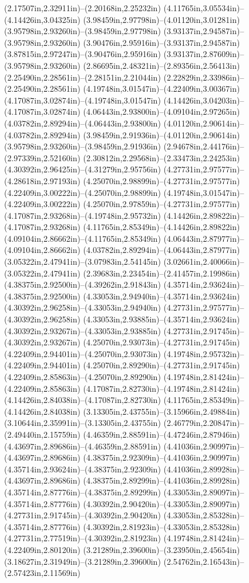 (2.17507in,2.32911in)--(2.20168in,2.25232in) (4.11765in,3.05534in)--(4.14426in,3.04325in) (3.98459in,2.97798in)--(4.01120in,3.01281in) (3.95798in,2.93260in)--(3.98459in,2.97798in) (3.93137in,2.94587in)--(3.95798in,2.93260in) (3.90476in,2.95916in)--(3.93137in,2.94587in) (3.87815in,2.97247in)--(3.90476in,2.95916in) (3.93137in,2.87609in)--(3.95798in,2.93260in) (2.86695in,2.48321in)--(2.89356in,2.56413in) (2.25490in,2.28561in)--(2.28151in,2.21044in) (2.22829in,2.33986in)--(2.25490in,2.28561in) (4.19748in,3.01547in)--(4.22409in,3.00367in) (4.17087in,3.02874in)--(4.19748in,3.01547in) (4.14426in,3.04203in)--(4.17087in,3.02874in) (4.06443in,2.93800in)--(4.09104in,2.97265in) (4.03782in,2.89294in)--(4.06443in,2.93800in) (4.01120in,2.90614in)--(4.03782in,2.89294in) (3.98459in,2.91936in)--(4.01120in,2.90614in) (3.95798in,2.93260in)--(3.98459in,2.91936in) (2.94678in,2.44176in)--(2.97339in,2.52160in) (2.30812in,2.29568in)--(2.33473in,2.24253in) (4.30392in,2.96425in)--(4.31279in,2.95756in) (4.27731in,2.97577in)--(4.28618in,2.97193in) (4.25070in,2.98899in)--(4.27731in,2.97577in) (4.22409in,3.00222in)--(4.25070in,2.98899in) (4.19748in,3.01547in)--(4.22409in,3.00222in) (4.25070in,2.97859in)--(4.27731in,2.97577in) (4.17087in,2.93268in)--(4.19748in,2.95732in) (4.14426in,2.89822in)--(4.17087in,2.93268in) (4.11765in,2.85349in)--(4.14426in,2.89822in) (4.09104in,2.86662in)--(4.11765in,2.85349in) (4.06443in,2.87977in)--(4.09104in,2.86662in) (4.03782in,2.89294in)--(4.06443in,2.87977in) (3.05322in,2.47941in)--(3.07983in,2.54145in) (3.02661in,2.40066in)--(3.05322in,2.47941in) (2.39683in,2.23454in)--(2.41457in,2.19986in) (4.38375in,2.92500in)--(4.39262in,2.91843in) (4.35714in,2.93624in)--(4.38375in,2.92500in) (4.33053in,2.94940in)--(4.35714in,2.93624in) (4.30392in,2.96258in)--(4.33053in,2.94940in) (4.27731in,2.97577in)--(4.30392in,2.96258in) (4.33053in,2.93885in)--(4.35714in,2.93624in) (4.30392in,2.93267in)--(4.33053in,2.93885in) (4.27731in,2.91745in)--(4.30392in,2.93267in) (4.25070in,2.93073in)--(4.27731in,2.91745in) (4.22409in,2.94401in)--(4.25070in,2.93073in) (4.19748in,2.95732in)--(4.22409in,2.94401in) (4.25070in,2.89290in)--(4.27731in,2.91745in) (4.22409in,2.85863in)--(4.25070in,2.89290in) (4.19748in,2.81424in)--(4.22409in,2.85863in) (4.17087in,2.82730in)--(4.19748in,2.81424in) (4.14426in,2.84038in)--(4.17087in,2.82730in) (4.11765in,2.85349in)--(4.14426in,2.84038in) (3.13305in,2.43755in)--(3.15966in,2.49884in) (3.10644in,2.35991in)--(3.13305in,2.43755in) (2.46779in,2.20847in)--(2.49440in,2.15759in) (4.46359in,2.88591in)--(4.47246in,2.87946in) (4.43697in,2.89686in)--(4.46359in,2.88591in) (4.41036in,2.90997in)--(4.43697in,2.89686in) (4.38375in,2.92309in)--(4.41036in,2.90997in) (4.35714in,2.93624in)--(4.38375in,2.92309in) (4.41036in,2.89928in)--(4.43697in,2.89686in) (4.38375in,2.89299in)--(4.41036in,2.89928in) (4.35714in,2.87776in)--(4.38375in,2.89299in) (4.33053in,2.89097in)--(4.35714in,2.87776in) (4.30392in,2.90420in)--(4.33053in,2.89097in) (4.27731in,2.91745in)--(4.30392in,2.90420in) (4.33053in,2.85328in)--(4.35714in,2.87776in) (4.30392in,2.81923in)--(4.33053in,2.85328in) (4.27731in,2.77519in)--(4.30392in,2.81923in) (4.19748in,2.81424in)--(4.22409in,2.80120in) (3.21289in,2.39600in)--(3.23950in,2.45654in) (3.18627in,2.31949in)--(3.21289in,2.39600in) (2.54762in,2.16543in)--(2.57423in,2.11569in) 